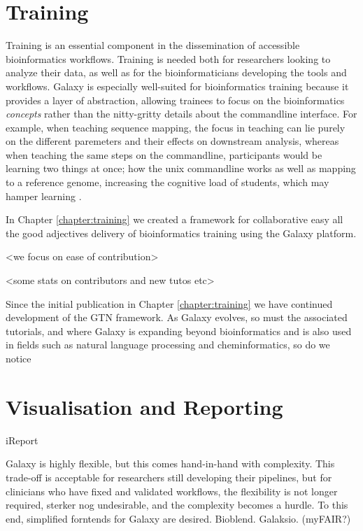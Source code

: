 \section{Training}
Training is an essential component in the dissemination of accessible bioinformatics workflows. Training is needed both for researchers looking to analyze their data, as well as for the bioinformaticians developing the tools and workflows. Galaxy is especially well-suited for bioinformatics training because it provides a layer of abstraction, allowing trainees to focus on the bioinformatics \emph{concepts} rather than the nitty-gritty details about the commandline interface. For example, when teaching sequence mapping, the focus in teaching can lie purely on the different paremeters and their effects on downstream analysis, whereas when teaching the same steps on the commandline, participants would be learning two things at once; how the unix commandline works as well as mapping to a reference genome, increasing the cognitive load of students, which may hamper learning \cite{paas2003cognitive}.

In Chapter \ref{chapter:training} we created a framework for collaborative easy all the good adjectives delivery of bioinformatics training using the Galaxy platform.

<we focus on ease of contribution>

<some stats on contributors and new tutos etc>

Since the initial publication in Chapter \ref{chapter:training} we have continued development of the GTN framework. As Galaxy evolves, so must the associated tutorials, and where Galaxy is expanding beyond bioinformatics and is also used in fields such as natural language processing and cheminformatics, so do we notice



\section{Visualisation and Reporting}

iReport

Galaxy is highly flexible, but this comes hand-in-hand with complexity. This trade-off is acceptable for researchers still developing their pipelines, but for clinicians who have fixed and validated workflows, the flexibility is not longer required, sterker nog undesirable, and the complexity becomes a hurdle. To this end, simplified forntends for Galaxy are desired. Bioblend. Galaksio. (myFAIR?)


